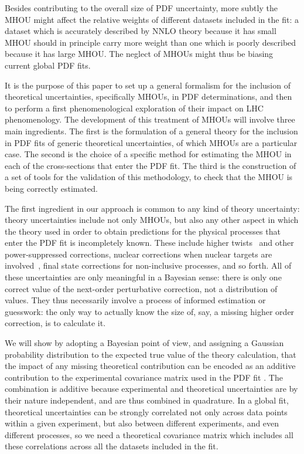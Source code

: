 Besides contributing to the overall size of PDF uncertainty, more subtly the MHOU might affect the relative weights of different datasets 
included in the fit: a dataset which is accurately described by NNLO theory because it has small MHOU should in principle carry more weight than one which is poorly described because it has large MHOU. The neglect of MHOUs might thus be biasing current global PDF fits.

It is the purpose of this paper to set up a general formalism for the
inclusion of theoretical uncertainties, specifically MHOUs, in PDF
determinations, and then to perform a first phenomenological
exploration of their impact on LHC phenomenology.
%
The development of this treatment of MHOUs will involve three main ingredients.
%
The first
is the formulation of a general theory for the inclusion  in PDF fits of
generic theoretical uncertainties, of which MHOUs are a particular
case.
%
The second is the choice of a specific method for estimating the 
MHOU in each of the cross-sections that enter the PDF fit.
%
The third is the construction of a set of tools for the
validation of this methodology, to check that the MHOU is being correctly 
estimated.

The first ingredient in our approach is common to any kind of theory 
uncertainty: theory uncertainties include not only MHOUs, but also any other aspect in which the theory used in order to obtain
predictions for the physical processes that enter the PDF fit is 
incompletely known. These
include higher twists~\cite{Ball:2013gsa} and other power-suppressed corrections, nuclear
corrections when nuclear targets are involved~\cite{Ball:2018twp}, final state corrections for non-inclusive processes, and so forth.
%
All of these uncertainties are only meaningful in a
Bayesian sense: there is only one correct value of the
next-order perturbative correction, not a distribution of values.
%
They thus necessarily involve a process of informed estimation
or guesswork: the only way to actually know the size of, say, a missing
higher order correction, is to calculate it.

We will show by adopting a Bayesian
point of view, and assigning a Gaussian probability distribution to the
expected true value of the theory calculation, that the impact of 
any missing theoretical contribution can be encoded as an 
additive contribution to the experimental covariance matrix used in the 
PDF fit \cite{Ball:2018odr}. The combination is additive because experimental and theoretical uncertainties are by their nature independent, and are thus combined in quadrature. In a global fit, theoretical uncertainties 
can be strongly correlated not only across data points within a given 
experiment, but also between different experiments, and even different 
processes, so we need a theoretical covariance matrix which includes all these correlations across all the datasets included in the fit.

